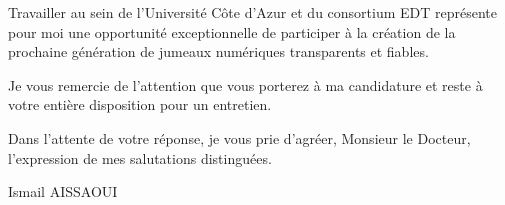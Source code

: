 \documentclass[11pt,a4paper]{article}
\begin{document}
Travailler au sein de l'Université Côte d'Azur et du consortium EDT représente pour moi une opportunité exceptionnelle de participer à la création de la prochaine génération de jumeaux numériques transparents et fiables.

Je vous remercie de l'attention que vous porterez à ma candidature et reste à votre entière disposition pour un entretien.

Dans l'attente de votre réponse, je vous prie d'agréer, Monsieur le Docteur, l'expression de mes salutations distinguées.

\bigskip

\noindent Ismail AISSAOUI
\end{document}
